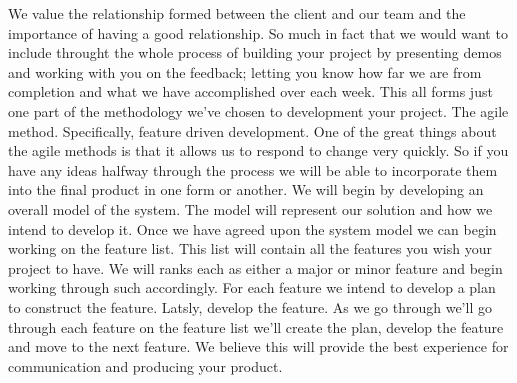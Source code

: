 We value the relationship formed between the client and our team and the importance of having a good relationship. So much in fact that we would want to include throught the whole process of building your project by presenting demos and working with you on the feedback; letting you know how far we are from completion and what we have accomplished over each week. This all forms just one part of the methodology we've chosen to development your project. The agile method. Specifically, feature driven development. One of the great things about the agile methods is that it allows us to respond to change very quickly. So if you have any ideas halfway through the process we will be able to incorporate them into the final product in one form or another. We will begin by developing an overall model of the system. The model will represent our solution and how we intend to develop it. Once we have agreed upon the system model we can begin working on the feature list. This list will contain all the features you wish your project to have. We will ranks each as either a major or minor feature and begin working through such accordingly. For each feature we intend to develop a plan to construct the feature. Latsly, develop the feature. As we go through we'll go through each feature on the feature list we'll create the plan, develop the feature and move to the next feature. We believe this will provide the best experience for communication and producing your product.  